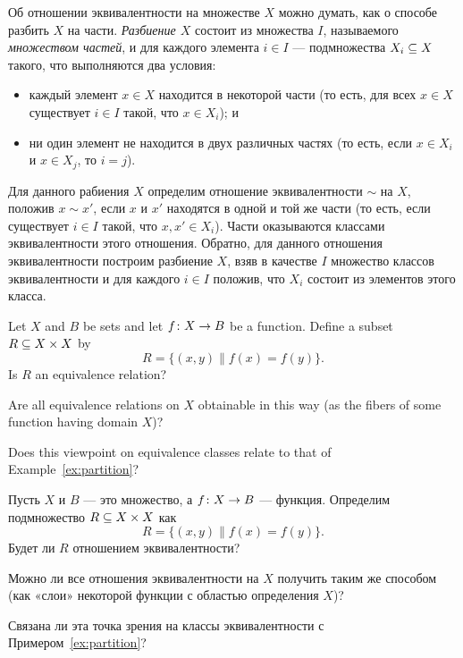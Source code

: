 \documentclass[CT4S-EN-RU]{subfiles}
\begin{document}
\begin{exampleRUS}[Разбиения]\label{ex:partition}
Об отношении эквивалентности на множестве $X$ можно думать, как о способе разбить $X$ на части. {\em Разбиение $X$} состоит из множества $I$, называемого {\em множеством частей}, и для каждого элемента $i\in I$ — подмножества $X_i\ss X$ такого, что выполняются два условия:
\begin{itemize}
\item каждый элемент $x\in X$ находится в некоторой части (то есть, для всех $x\in X$ существует $i\in I$ такой, что $x\in X_i$); и
\item ни один элемент не находится в двух различных частях (то есть, если $x\in X_i$ и $x\in X_j$, то $i=j$).
\end{itemize}

Для данного рабиения $X$ определим отношение эквивалентности $\sim$ на $X$, положив $x\sim x'$, если $x$ и $x'$ находятся в одной и той же части (то есть, если существует $i\in I$ такой, что $x,x'\in X_i$). Части оказываются классами эквивалентности этого отношения. Обратно, для данного отношения эквивалентности построим разбиение $X$, взяв в качестве $I$ множество классов эквивалентности и для каждого $i\in I$ положив, что $X_i$ состоит из элементов этого класса.
\end{exampleRUS}

\begin{exerciseENG}
Let $X$ and $B$ be sets and let $f\taking X\to B$ be a function. Define a subset $R\ss X\times X$ by $$R=\{(x,y)\|f(x)=f(y)\}.$$ 
\sexc Is $R$ an equivalence relation? 
\item Are all equivalence relations on $X$ obtainable in this way (as the fibers of some function having domain $X$)?
\item Does this viewpoint on equivalence classes relate to that of Example~\ref{ex:partition}?
\endsexc
\end{exerciseENG}

\begin{exerciseRUS}
Пусть $X$ и $B$ — это множество, а $f\taking X\to B$ — функция. Определим подмножество $R\ss X\times X$ как $$R=\{(x,y)\|f(x)=f(y)\}.$$ 
\sexc Будет ли $R$ отношением эквивалентности? 
\item Можно ли все отношения эквивалентности на $X$ получить таким же способом (как «слои» некоторой функции с областью определения $X$)?
\item Связана ли эта точка зрения на классы эквивалентности с Примером~\ref{ex:partition}?
\endsexc
\end{exerciseRUS}
\end{document}
